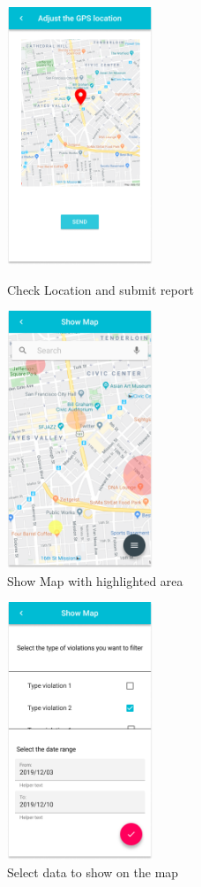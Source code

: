 \documentclass{article}
\begin{document}
\clearpage
\begin{figure}[!htb]
	\centering
	\begin{minipage}{.45\textwidth}
		\centering
		\includegraphics[height=7.7cm,keepaspectratio]{images/mockups/Create_report_GPS.png}
		\caption{Check Location and submit report}
	\end{minipage}\quad
	\begin{minipage}{.45\textwidth}
		\centering
		\includegraphics[height=7.7cm,keepaspectratio]{images/mockups/Show_Map.png}
		\caption{Show Map with highlighted area}
	\end{minipage}
\end{figure}

\begin{figure}[!htb]
	\centering
	\includegraphics[height=7.7cm,keepaspectratio]{images/mockups/Show_Map_Filter.png}
	\caption{Select data to show on the map}
\end{figure}
\end{document}
